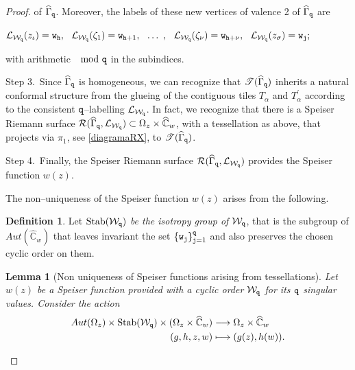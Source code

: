\documentclass[final,3p,times]{elsarticle}
\newcommand{\CW}{\ensuremath{{\widehat{\mathbb C}}}}
\newcommand{\R}{\ensuremath{{\mathcal R}}}
\newtheorem{lemma}[theorem]{Lemma}
\theoremstyle{definition}
\newtheorem{definition}[theorem]{Definition}
\begin{document}
\begin{proof}
\noindent 
of $\widehat{\Gamma}_{\tt q}$. Moreover, the labels of these new 
vertices of valence 2 of $\widehat{\Gamma}_{\tt q}$ are

\centerline{$
\mathcal{L}_{\mathcal{W}_{\tt q}}(z_\iota) = {\tt w}_{\tt h} ,\ \ 
\mathcal{L}_{\mathcal{W}_{\tt q}}(\zeta_1) = {\tt w}_{{\tt h}+1} , \ \ 
\ldots \ ,  \ \ 
\mathcal{L}_{\mathcal{W}_{\tt q}}(\zeta_\nu) = {\tt w}_{{\tt h} + \nu} , \ \ 
\mathcal{L}_{\mathcal{W}_{\tt q}}(z_\sigma) = {\tt w}_{\tt j} ;
$}

\noindent
with arithmetic \hspace{-10pt} $\mod{\tt q} $ in the subindices.

\smallskip
\noindent
Step 3.\ Since $\widehat{\Gamma}_{\tt q}$ is homogeneous, we can recognize
that $\mathscr{T}(\widehat{\Gamma}_{\tt q})$ inherits a natural conformal structure 
from the glueing of the contiguous tiles $T_\alpha$ and $T_\alpha^\prime$ according
to the consistent $\tt q$--labelling $\mathcal{L}_{\mathcal{W}_{\tt q}}$.
In fact, we recognize that there is a Speiser Riemann surface 
$\R(\widehat{\Gamma}_{\tt q},\mathcal{L}_{\mathcal{W}_{\tt q}}) \subset \Omega_z \times \CW_w$, 
with a tessellation as above, that projects via $\pi_1$, see \eqref{diagramaRX}, 
to $\mathscr{T}(\widehat{\Gamma}_{\tt q})$.

\smallskip
\noindent
Step 4.\ Finally, the Speiser Riemann surface $\R(\widehat{\Gamma}_{\tt q},\mathcal{L}_{\mathcal{W}_{\tt q}})$ provides 
the Speiser function $w(z)$.

The non--uniqueness of the Speiser function $w(z)$ arises from the following.
\begin{definition}\label{def:isotropy-Wq}
Let \emph{$\text{Stab}(\mathcal{W}_{\tt q})$ be the isotropy group of $\mathcal{W}_{\tt q}$}, 
that is the subgroup of $Aut(\CW_w)$ that leaves invariant the set $\{ {\tt w}_{\tt j} \}_{{\tt j}=1}^{\tt q}$ 
and also preserves the chosen cyclic order on them.
\end{definition}

\begin{lemma}[Non uniqueness of Speiser functions arising from tessellations]
\label{lem:no-unicidad-funciones-teselaciones}
Let $w(z)$ be a Speiser function provided with a cyclic order 
$\mathcal{W}_{\tt q}$ for its $\tt q$ singular values.
Consider the action 
\begin{align*}
Aut(\Omega_z) \times \text{Stab}(\mathcal{W}_{\tt q}) \times (\Omega_z \times \CW_w )
& \longrightarrow  \Omega_z \times \CW_w \\
(g,h,z,w) & \longmapsto  (g(z), h(w)).
\end{align*}


\end{lemma}
\end{proof}
\end{document}
